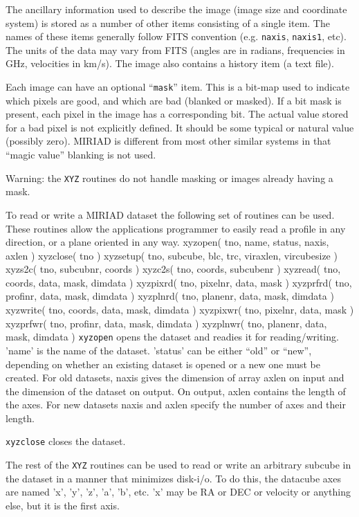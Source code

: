 The ancillary information
used to describe the image (image size and coordinate system) is stored as
a number of other items consisting of a single item. The names of these items
generally follow FITS convention (e.g. {\tt naxis}, {\tt naxis1}, etc). The
units of the data may vary from FITS (angles are in radians, frequencies in
GHz, velocities in km/s). The image also contains a history item (a text file).

Each image can have an optional ``{\tt mask}'' item. This is a bit-map
used to indicate which pixels are good, and which are bad (blanked or masked).
If a bit mask is present, each pixel in the image has a corresponding bit.
The actual value stored for a bad pixel is not explicitly defined. It should
be some typical or natural value (possibly zero). MIRIAD is different
from most other similar systems in that ``magic value'' blanking is not used.


Warning:  the {\tt XYZ} routines do not handle masking or images already
having a mask.

To read or write a MIRIAD dataset the following set of routines can be used.
These routines allow the applications programmer to easily read a profile in
any direction, or a plane oriented in any way.
{\ninepoint\begintt
      xyzopen(  tno, name, status, naxis, axlen )
      xyzclose( tno )
      xyzsetup( tno, subcube, blc, trc, viraxlen, vircubesize )
      xyzs2c(   tno, subcubnr, coords )
      xyzc2s(   tno, coords, subcubenr )
      xyzread(  tno, coords,  data, mask, dimdata )
      xyzpixrd( tno, pixelnr, data, mask )
      xyzprfrd( tno, profinr, data, mask, dimdata )
      xyzplnrd( tno, planenr, data, mask, dimdata )
      xyzwrite( tno, coords,  data, mask, dimdata )
      xyzpixwr( tno, pixelnr, data, mask )
      xyzprfwr( tno, profinr, data, mask, dimdata )
      xyzplnwr( tno, planenr, data, mask, dimdata )
\endtt}
{\tt xyzopen} opens the dataset and readies it for reading/writing. 'name'
is the name of the dataset. 'status' can be either ``old'' or ``new'',
depending on whether an existing dataset is opened or a new one must be
created. For old datasets, naxis gives the dimension of array axlen on
input and the dimension of the dataset on output. On output, axlen contains
the length of the axes.  For new datasets naxis and axlen specify the number
of axes and their length.

{\tt xyzclose} closes the dataset.

The rest of the {\tt XYZ} routines can be used to read or write an arbitrary
subcube in the dataset in a manner that minimizes disk-i/o. To do this,
the datacube axes are named 'x', 'y', 'z', 'a', 'b', etc. 'x' may be RA
or DEC or velocity or anything else, but it is the first axis.

